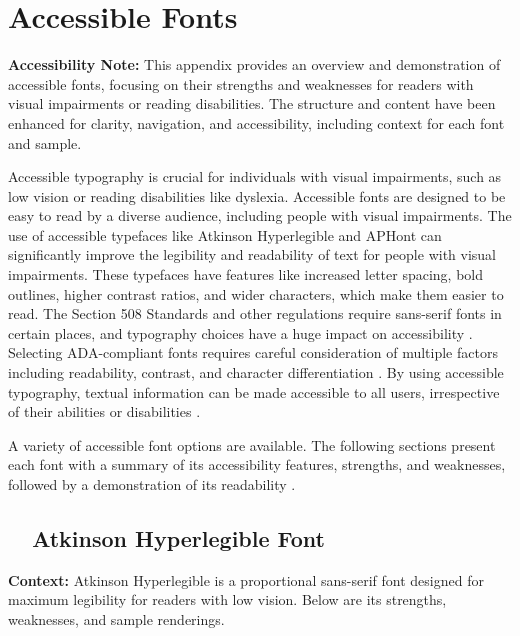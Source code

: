 \chapter{Accessible Fonts}\label{app5:appx66}
\begin{raggedright}
	\textbf{Accessibility Note:} This appendix provides an overview and demonstration of accessible fonts, focusing on their strengths and weaknesses for readers with visual impairments or reading disabilities. The structure and content have been enhanced for clarity, navigation, and accessibility, including context for each font and sample.

	Accessible typography is crucial for individuals with visual impairments, such as low vision or reading disabilities like dyslexia. Accessible fonts are designed to be easy to read by a diverse audience, including people with visual impairments. The use of accessible typefaces like Atkinson Hyperlegible and APHont can significantly improve the legibility and readability of text for people with visual impairments. These typefaces have features like increased letter spacing, bold outlines, higher contrast ratios, and wider characters, which make them easier to read. The Section 508 Standards \supercite{Section508} and other regulations require sans-serif fonts in certain places, and typography choices have a huge impact on accessibility \supercite{AccessiBe}. Selecting ADA-compliant fonts requires careful consideration of multiple factors including readability, contrast, and character differentiation \supercite{AccessiBeFonts}. By using accessible typography, textual information can be made accessible to all users, irrespective of their abilities or disabilities \supercite{ReadabilityGroup, HubSpot}.

	A variety of accessible font options are available. The following sections present each font with a summary of its accessibility features, strengths, and weaknesses, followed by a demonstration of its readability \supercite{EmptyBoxNote}.
\end{raggedright}


\section{~~Atkinson Hyperlegible Font}\label{app5:sec:atkinson-hyperlegible}
\noindent
\textbf{Context:} Atkinson Hyperlegible is a proportional sans-serif font designed for maximum legibility for readers with low vision. Below are its strengths, weaknesses, and sample renderings.

